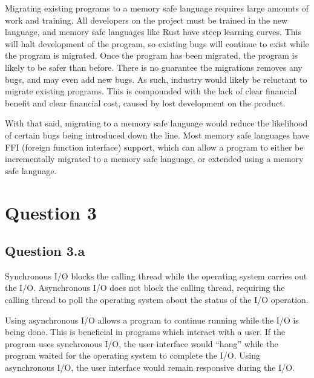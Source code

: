 \documentclass[]{article}
\begin{document}
Migrating existing programs to a memory safe language requires large amounts of
work and training.
All developers on the project must be trained in the new language, and memory
safe languages like Rust have steep learning curves.
This will halt development of the program, so existing bugs will continue to
exist while the program is migrated.
Once the program has been migrated, the program is likely to be safer than
before.
There is no guarantee the migrations removes any bugs, and may even add new
bugs.
As such, industry would likely be reluctant to migrate existing programs.
This is compounded with the lack of clear financial benefit and clear financial
cost, caused by lost development on the product.

With that said, migrating to a memory safe language would reduce the likelihood
of certain bugs being introduced down the line.
Most memory safe languages have FFI (foreign function interface) support, which
can allow a program to either be incrementally migrated to a memory safe
language, or extended using a memory safe language.

\section{Question 3}
\subsection{Question 3.a}
Synchronous I/O blocks the calling thread while the operating system carries
out the I/O.
Asynchronous I/O does not block the calling thread, requiring the calling
thread to poll the operating system about the status of the I/O operation.

Using asynchronous I/O allows a program to continue running while the I/O is
being done.
This is beneficial in programs which interact with a user.
If the program uses synchronous I/O, the user interface would ``hang'' while the
program waited for the operating system to complete the I/O.
Using asynchronous I/O, the user interface would remain responsive during the
I/O.
\end{document}
